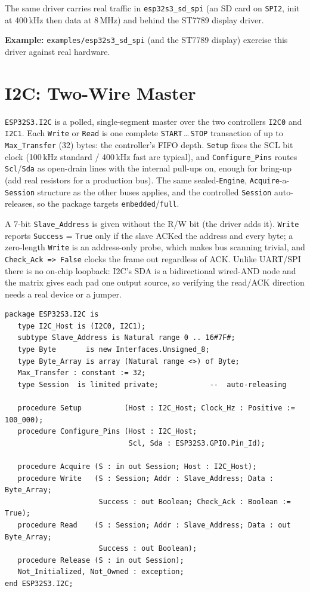 The same driver carries real traffic in \texttt{esp32s3\_sd\_spi} (an SD card on
\texttt{SPI2}, init at 400\,kHz then data at 8\,MHz) and behind the ST7789
display driver.

\noindent\textbf{Example:} \texttt{examples/esp32s3\_sd\_spi} (and the ST7789
display) exercise this driver against real hardware.

\section{I2C: Two-Wire Master}
\label{app:int:i2c}

\texttt{ESP32S3.I2C} is a polled, single-segment master over the two
controllers \texttt{I2C0} and \texttt{I2C1}. Each \texttt{Write} or
\texttt{Read} is one complete \texttt{START}\,\ldots\,\texttt{STOP} transaction
of up to \texttt{Max\_Transfer} (32) bytes: the controller's FIFO depth.
\texttt{Setup} fixes the SCL bit clock (100\,kHz standard / 400\,kHz fast are
typical), and \texttt{Configure\_Pins} routes \texttt{Scl}/\texttt{Sda} as
open-drain lines with the internal pull-ups on, enough for bring-up (add real
resistors for a production bus). The same sealed-\texttt{Engine},
\texttt{Acquire}-a-\texttt{Session} structure as the other buses applies, and the
controlled \texttt{Session} auto-releases, so the package targets
\texttt{embedded}/\texttt{full}.

A 7-bit \texttt{Slave\_Address} is given without the R/W bit (the driver adds
it). \texttt{Write} reports \texttt{Success} = \texttt{True} only if the slave
ACKed the address and every byte; a zero-length \texttt{Write} is an
address-only probe, which makes bus scanning trivial, and \texttt{Check\_Ack =>
False} clocks the frame out regardless of ACK. Unlike UART/SPI there is no
on-chip loopback: I2C's SDA is a bidirectional wired-AND node and the matrix
gives each pad one output source, so verifying the read/ACK direction needs a
real device or a jumper.

\begin{lstlisting}
package ESP32S3.I2C is
   type I2C_Host is (I2C0, I2C1);
   subtype Slave_Address is Natural range 0 .. 16#7F#;
   type Byte       is new Interfaces.Unsigned_8;
   type Byte_Array is array (Natural range <>) of Byte;
   Max_Transfer : constant := 32;
   type Session  is limited private;            --  auto-releasing

   procedure Setup          (Host : I2C_Host; Clock_Hz : Positive := 100_000);
   procedure Configure_Pins (Host : I2C_Host;
                             Scl, Sda : ESP32S3.GPIO.Pin_Id);

   procedure Acquire (S : in out Session; Host : I2C_Host);
   procedure Write   (S : Session; Addr : Slave_Address; Data : Byte_Array;
                      Success : out Boolean; Check_Ack : Boolean := True);
   procedure Read    (S : Session; Addr : Slave_Address; Data : out Byte_Array;
                      Success : out Boolean);
   procedure Release (S : in out Session);
   Not_Initialized, Not_Owned : exception;
end ESP32S3.I2C;
\end{lstlisting}


